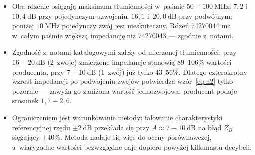 \documentclass[11pt,a4paper]{article}
\begin{document}
\begin{itemize}
  \item Oba rdzenie osiągają maksimum tłumienności w~paśmie $50-100\ \mathrm{MHz}$:
        $7{,}2$ i~$10{,}4\ \mathrm{dB}$ przy pojedynczym uzwojeniu, $16{,}1$
        i~$20{,}0\ \mathrm{dB}$ przy podwójnym; poniżej $10\ \mathrm{MHz}$ pojedynczy
        zwój jest nieskuteczny. Rdzeń 74270044 ma w~całym paśmie większą impedancję
        niż 74270043 --- zgodnie z~notami.

  \item Zgodność z~notami katalogowymi zależy od mierzonej tłumienności: przy
        $16-20\ \mathrm{dB}$ (2~zwoje) zmierzone impedancje stanowią 89--106\% wartości
        producenta, przy $7-10\ \mathrm{dB}$ (1~zwój) już tylko 43--56\%. Dlatego
        czterokrotny wzrost impedancji po podwojeniu zwojów potwierdza wzór~\eqref{eq:n2}
        tylko pozornie --- zawyża go zaniżona wartość jednozwojowa; producent podaje
        stosunek $1{,}7-2{,}6$.

  \item Ograniczeniem jest warunkowanie metody: falowanie charakterystyki referencyjnej
        rzędu $\pm 2\ \mathrm{dB}$ przekłada się przy $A \approx 7-10\ \mathrm{dB}$ na
        błąd $Z_B$ sięgający $\pm 40\%$. Metoda nadaje się więc do oceny porównawczej,
        a~wiarygodne wartości bezwzględne daje dopiero powyżej kilkunastu decybeli.
\end{itemize}
\end{document}
